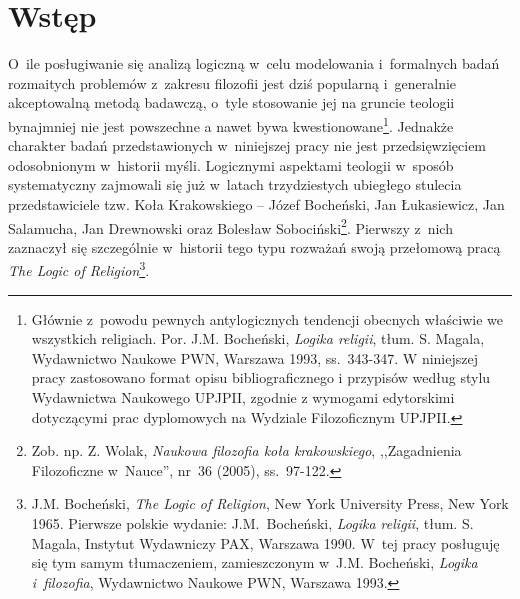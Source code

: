 \chapter*{Wstęp}

O~ile posługiwanie się analizą logiczną w~celu modelowania i~formalnych badań rozmaitych problemów z~zakresu filozofii jest dziś popularną i~generalnie akceptowalną metodą badawczą, o~tyle stosowanie jej na gruncie teologii bynajmniej nie jest powszechne a nawet bywa kwestionowane\footnote{Głównie z~powodu pewnych antylogicznych tendencji obecnych właściwie we wszystkich religiach. Por. J.M. Bocheński, \textit{Logika religii}, tłum. S. Magala, Wydawnictwo Naukowe PWN, Warszawa 1993, ss.~343-347.
W niniejszej pracy zastosowano format opisu bibliograficznego i przypisów  według stylu Wydawnictwa Naukowego UPJPII, zgodnie z wymogami edytorskimi dotyczącymi prac dyplomowych na Wydziale Filozoficznym UPJPII.
}.
Jednakże charakter badań przedstawionych w~niniejszej pracy nie jest przedsięwzięciem odosobnionym w~historii myśli. Logicznymi aspektami teologii w~sposób systematyczny zajmowali się już w~latach trzydziestych ubiegłego stulecia przedstawiciele tzw. Koła Krakowskiego -- Józef Bocheński, Jan Łukasiewicz, Jan Salamucha, Jan Drewnowski oraz Bolesław Sobociński\footnote{Zob. np. Z. Wolak, \textit{Naukowa filozofia koła krakowskiego}, ,,Zagadnienia Filozoficzne w~Nauce'', nr~36 (2005), ss.~97-122.
}.
Pierwszy z~nich zaznaczył się szczególnie w~historii tego typu rozważań swoją przełomową pracą \textit{The Logic of Religion}\footnote{J.M. Bocheński, \textit{The Logic of Religion}, New York University Press, New York 1965. Pierwsze polskie wydanie: J.M.~Bocheński, \textit{Logika religii}, tłum. S. Magala, Instytut Wydawniczy PAX, Warszawa 1990. W~tej pracy posługuję się tym samym tłumaczeniem, zamieszczonym w~J.M. Bocheński, \textit{Logika i~filozofia}, Wydawnictwo Naukowe PWN, Warszawa 1993.}.
